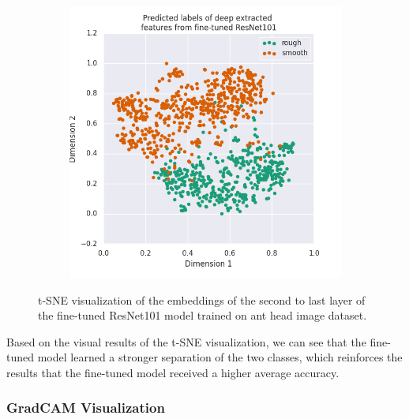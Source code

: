 \documentclass[12pt]{article}
\begin{document}
\begin{figure}[h]
\begin{subfigure}{.45\textwidth}
        \includegraphics[width=1\linewidth]{assets/plots/fresnet101_pred_tsne.png}
    \end{subfigure}
    \caption{t-SNE visualization of the embeddings of the second to last layer
        of the fine-tuned ResNet101 model trained on ant head image dataset.}
    \label{fig:fresnet101_tsne}
\end{figure}

Based on the visual results of the t-SNE visualization, we can see that the
fine-tuned model learned a stronger separation of the two classes, which
reinforces the results that the fine-tuned model received a higher average
accuracy.

\clearpage
\subsubsection{GradCAM Visualization}
\end{document}
